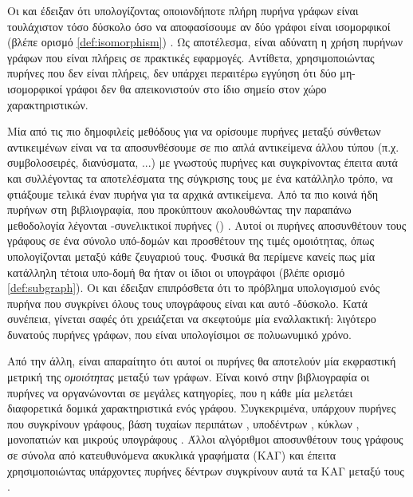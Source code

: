 Οι  και  έδειξαν ότι υπολογίζοντας οποιονδήποτε πλήρη πυρήνα γράφων είναι τουλάχιστον τόσο δύσκολο όσο να αποφασίσουμε αν δύο γράφοι είναι ισομορφικοί (βλέπε ορισμό \ref{def:isomorphism}) \cite{Gartner03ongraph}.
Ως αποτέλεσμα, είναι αδύνατη η χρήση πυρήνων γράφων που είναι πλήρεις σε πρακτικές εφαρμογές.
Αντίθετα, χρησιμοποιώντας πυρήνες που δεν είναι πλήρεις, δεν υπάρχει περαιτέρω εγγύηση ότι δύο μη-ισομορφικοί γράφοι δεν θα απεικονιστούν στο ίδιο σημείο στον χώρο χαρακτηριστικών.\par
Μία από τις πιο δημοφιλείς μεθόδους για να ορίσουμε πυρήνες μεταξύ σύνθετων αντικειμένων είναι να τα αποσυνθέσουμε σε πιο απλά αντικείμενα άλλου τύπου (π.χ. συμβολοσειρές, διανύσματα, ...) με γνωστούς πυρήνες και συγκρίνοντας έπειτα αυτά και συλλέγοντας τα αποτελέσματα της σύγκρισης τους με ένα κατάλληλο τρόπο, να φτιάξουμε τελικά έναν πυρήνα για τα αρχικά αντικείμενα.
Από τα πιο κοινά ήδη πυρήνων στη βιβλιογραφία, που προκύπτουν ακολουθώντας την παραπάνω μεθοδολογία λέγονται -συνελικτικοί πυρήνες () \cite{Haussler1999ConvolutionKO}.
Αυτοί οι πυρήνες αποσυνθέτουν τους γράφους σε ένα σύνολο υπό-δομών και προσθέτουν της τιμές ομοιότητας, όπως υπολογίζονται μεταξύ κάθε ζευγαριού τους.
Φυσικά θα περίμενε κανείς πως μία κατάλληλη τέτοια υπο-δομή θα ήταν οι ίδιοι οι υπογράφοι (βλέπε ορισμό \ref{def:subgraph}).
Οι  και  έδειξαν επιπρόσθετα ότι το πρόβλημα υπολογισμού ενός πυρήνα που συγκρίνει όλους τους υπογράφους είναι και αυτό -δύσκολο.
Κατά συνέπεια, γίνεται σαφές ότι χρειάζεται να σκεφτούμε μία εναλλακτική: λιγότερο δυνατούς πυρήνες γράφων, που είναι υπολογίσιμοι σε πολυωνυμικό χρόνο.\par
Από την άλλη, είναι απαραίτητο ότι αυτοί οι πυρήνες θα αποτελούν μία εκφραστική μετρική της \textit{ομοιότητας} μεταξύ των γράφων.
Είναι κοινό στην βιβλιογραφία οι πυρήνες να οργανώνονται σε μεγάλες κατηγορίες, που η κάθε μία μελετάει διαφορετικά δομικά χαρακτηριστικά ενός γράφου.
Συγκεκριμένα, υπάρχουν πυρήνες που συγκρίνουν γράφους, βάση τυχαίων περιπάτων \cite{gartner2003graph, borgwardt2005protein, vishwanathan2010graph}, υποδέντρων \cite{Ramon03expressivityversus, Bach2008, Mahe2009}, κύκλων \cite{Horvath2004}, μονοπατιών \cite{Borgwardt2005, Giscard2017} και μικρούς υπογράφους \cite{Costa2010, Hido2009, Kriege2012SubgraphMK, shervashidze2009efficient}.
Άλλοι αλγόριθμοι αποσυνθέτουν τους γράφους σε σύνολα από κατευθυνόμενα ακυκλικά γραφήματα (ΚΑΓ) και έπειτα χρησιμοποιώντας υπάρχοντες πυρήνες δέντρων συγκρίνουν αυτά τα ΚΑΓ μεταξύ τους \cite{Martino2006}.
